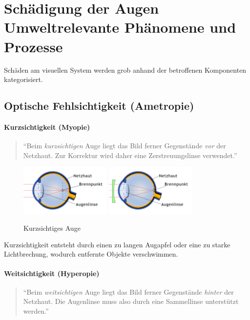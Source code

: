 \section[Schädigung der Augen\hfill Umweltrelevante Phänomene und Prozesse]{Schädigung der Augen\\{\normalsize Umweltrelevante Phänomene und Prozesse}}
Schäden am visuellen System werden grob anhand der betroffenen Komponenten kategorisiert.

\subsection{Optische Fehlsichtigkeit (Ametropie)}


\paragraph{Kurzsichtigkeit (Myopie)}
\begin{quote}
\enquote{Beim \textit{kurzsichtigen} Auge liegt das Bild ferner Gegenstände \textit{vor} der Netzhaut. Zur Korrektur wird daher eine Zerstreuungslinse verwendet.} \cite[S. 236]{physik1}
\end{quote}

\begin{figure}
\centering
\includegraphics[width=4.5cm]{images/kurzsichtig.png}
\hspace{1cm}
\includegraphics[width=4.5cm]{images/kurzsichtig_korrigiert.png}
\caption{Kurzsichtiges Auge \cite{abadi:fehlsichtigkeit}}
\end{figure}

Kurzsichtigkeit entsteht durch einen zu langen Augapfel oder eine zu starke Lichtbrechung, wodurch entfernte Objekte verschwimmen.

\paragraph{Weitsichtigkeit (Hyperopie)}
\begin{quote}
\enquote{Beim \textit{weitsichtigen} Auge liegt das Bild ferner Gegenstände \textit{hinter} der Netzhaut. Die Augenlinse muss also durch eine Sammellinse unterstützt werden.} \cite[S. 237]{physik1}
\end{quote}

